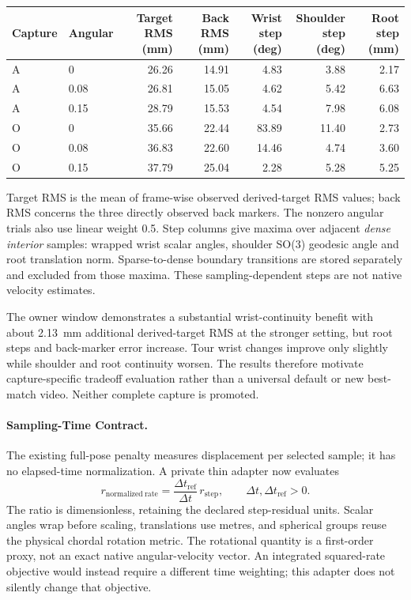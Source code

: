 \documentclass[11pt,a4paper]{article}
\begin{document}
\begin{center}
\small
\begin{tabular}{llrrrrr}
\toprule
Capture & Angular & \shortstack{Target\\RMS (mm)} &
\shortstack{Back\\RMS (mm)} & \shortstack{Wrist\\step (deg)} &
\shortstack{Shoulder\\step (deg)} & \shortstack{Root\\step (mm)} \\
\midrule
A & 0 & 26.26 & 14.91 & 4.83 & 3.88 & 2.17 \\
A & 0.08 & 26.81 & 15.05 & 4.62 & 5.42 & 6.63 \\
A & 0.15 & 28.79 & 15.53 & 4.54 & 7.98 & 6.08 \\
O & 0 & 35.66 & 22.44 & 83.89 & 11.40 & 2.73 \\
O & 0.08 & 36.83 & 22.60 & 14.46 & 4.74 & 3.60 \\
O & 0.15 & 37.79 & 25.04 & 2.28 & 5.28 & 5.25 \\
\bottomrule
\end{tabular}
\end{center}
Target RMS is the mean of frame-wise observed derived-target RMS values;
back RMS concerns the three directly observed back markers. The nonzero
angular trials also use linear weight 0.5. Step columns give maxima over
adjacent \emph{dense interior} samples: wrapped wrist scalar angles,
shoulder SO(3) geodesic angle and root translation norm. Sparse-to-dense
boundary transitions are stored separately and excluded from those maxima.
These sampling-dependent steps are not native velocity estimates.

The owner window demonstrates a substantial wrist-continuity benefit with
about 2.13~mm additional derived-target RMS at the stronger setting, but
root steps and back-marker error increase. Tour wrist changes improve only
slightly while shoulder and root continuity worsen. The results therefore
motivate capture-specific tradeoff evaluation rather than a universal
default or new best-match video. Neither complete capture is promoted.

\paragraph{Sampling-Time Contract.}
The existing full-pose penalty measures displacement per selected sample;
it has no elapsed-time normalization. A private thin adapter now evaluates
\[
 r_{\mathrm{normalized\ rate}}
 = \frac{\Delta t_{\mathrm{ref}}}{\Delta t}\,r_{\mathrm{step}},
 \qquad \Delta t,\Delta t_{\mathrm{ref}}>0.
\]
The ratio is dimensionless, retaining the declared step-residual units.
Scalar angles wrap before scaling, translations use metres, and spherical
groups reuse the physical chordal rotation metric. The rotational quantity
is a first-order proxy, not an exact native angular-velocity vector.
An integrated squared-rate objective would instead require a different
time weighting; this adapter does not silently change that objective.
\end{document}

